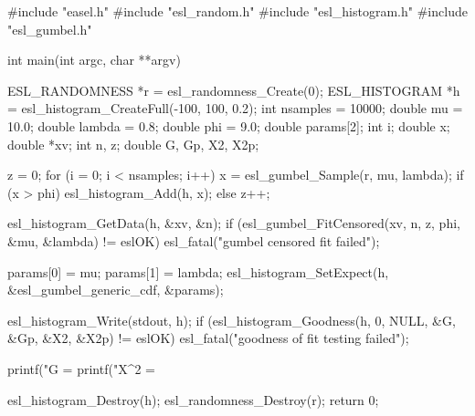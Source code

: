 \begin{cchunk}
#include "easel.h"
#include "esl_random.h"
#include "esl_histogram.h"
#include "esl_gumbel.h"

int
main(int argc, char **argv)
{
  ESL_RANDOMNESS *r  = esl_randomness_Create(0);
  ESL_HISTOGRAM  *h  = esl_histogram_CreateFull(-100, 100, 0.2);
  int     nsamples    = 10000;
  double  mu          = 10.0;
  double  lambda      = 0.8;
  double  phi         = 9.0;
  double  params[2];
  int     i;
  double  x;
  double *xv;
  int     n, z;
  double  G, Gp, X2, X2p;

  z = 0;
  for (i = 0; i < nsamples; i++) {
    x = esl_gumbel_Sample(r, mu, lambda);
    if (x > phi) esl_histogram_Add(h, x);
    else         z++;
  }

  esl_histogram_GetData(h, &xv, &n);
  if (esl_gumbel_FitCensored(xv, n, z, phi, &mu, &lambda) != eslOK)
    esl_fatal("gumbel censored fit failed");

  params[0] = mu;
  params[1] = lambda;
  esl_histogram_SetExpect(h, &esl_gumbel_generic_cdf, &params);

  esl_histogram_Write(stdout, h);
  if (esl_histogram_Goodness(h, 0, NULL, &G, &Gp, &X2, &X2p) != eslOK)
    esl_fatal("goodness of fit testing failed");

  printf("G   = %
  printf("X^2 = %

  esl_histogram_Destroy(h);
  esl_randomness_Destroy(r);
  return 0;
}
\end{cchunk}
